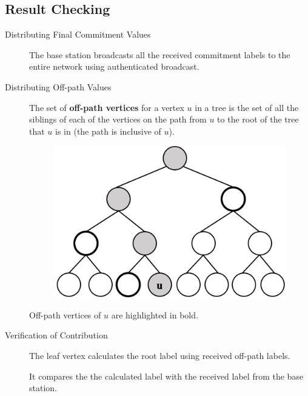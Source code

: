 \documentclass[%
  slidesonly,%
  semlayer%
  ]{seminar}                                  %
\newenvironment{defn}{\noindent \\ \noindent{\bf Defn:}}{\hspace*{\fill} \newline}
\begin{document}
\begin{slide}
    \subsection*{Result Checking}
      \vfill
      \begin{description}

      \item[Distributing Final Commitment Values]
        The base station broadcasts all the received commitment labels to the entire network using authenticated broadcast.

      \item[Distributing Off-path Values]      
          The set of \textbf{off-path vertices} for a vertex $u$ in a tree is the set of all the siblings of each of the vertices on the path from $u$ to the root of the tree that $u$ is in (the path is inclusive of $u$).
        \begin{figure}
          \centering
          \includegraphics[scale = 0.3]{images/off-path.png}
        \end{figure}
        \vfill
        \begin{center}
          \begin{small}
            Off-path vertices of $u$ are highlighted in bold.
          \end{small}
        \end{center}

      \item[Verification of Contribution]
        The leaf vertex calculates the root label using received off-path labels.
  
        It compares the the calculated label with the received label from the base station.
        

\end{description}
\end{slide}
\end{document}
